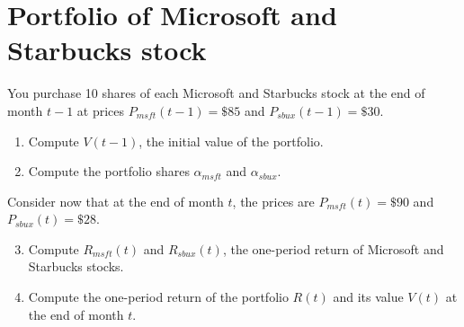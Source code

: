 \section{Portfolio of Microsoft and Starbucks stock}
You purchase 10 shares of each Microsoft and Starbucks stock at the end of month $t-1$ at prices
$P_{msft}(t-1) = \$85$ and $P_{sbux}(t-1) = \$30$. 
\begin{enumerate}
    \item Compute $V(t-1)$, the initial value of the portfolio.
    \item Compute the portfolio shares $\alpha_{msft}$ and $\alpha_{sbux}$.
\end{enumerate}

\noindent Consider now that at the end of month $t$, the prices are $P_{msft}(t) = \$90 $ and $P_{sbux}(t) = \$28$.
\begin{enumerate}
    \setcounter{enumi}{2}
    \item Compute $R_{msft}(t)$ and $R_{sbux}(t)$, the one-period return of Microsoft and Starbucks stocks. 
    \item Compute the one-period return of the portfolio $R(t)$ and its value $V(t)$ at the end of month $t$.
\end{enumerate}

